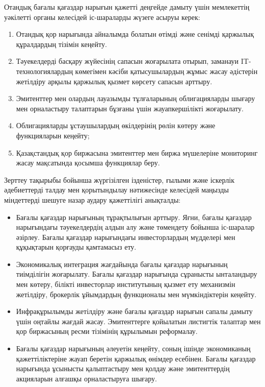 Отандық бағалы қағаздар нарығын қажетті деңгейде дамыту үшін мемлекеттің
уәкілетті органы келесідей іс-шараларды жүзеге асыруы керек:

\begin{enumerate}
\def\labelenumi{\arabic{enumi}.}
\item
  Отандық қор нарығында айналымда болатын өтімді және сенімді қаржылық
  құралдардың тізімін кеңейту.
\item
  Тәуекелдерді басқару жүйесінің сапасын жоғарылата отырып, заманауи
  IT-технологиялардың көмегімен кәсіби қатысушылардың жұмыс жасау
  әдістерін жетілдіру арқылы қаржылық қызмет көрсету сапасын арттыру.
\item
  Эмитенттер мен олардың лауазымды тұлғаларының облигацияларды шығару
  мен орналастыру талаптарын бұзғаны үшін жауапкершілікті жоғарылату.
\item
  Облигацияларды ұстаушылардың өкілдерінің рөлін көтеру және
  функцияларын кеңейту;
\item
  Қазақстандық қор биржасына эмитенттер мен биржа мүшелеріне мониторинг
  жасау мақсатында қосымша функциялар беру.
\end{enumerate}

Зерттеу тақырыбы бойынша жүргізілген ізденістер, ғылыми және іскерлік
әдебиеттерді талдау мен қорытындылау нәтижесінде келесідей маңызды
міндеттерді шешуге назар аудару қажеттілігі анықталды:

\begin{itemize}
\item
  Бағалы қағаздар нарығының тұрақтылығын арттыру. Яғни, бағалы қағаздар
  нарығындағы тәуекелдердің алдын алу және төмендету бойынша іс-шаралар
  әзірлеу. Бағалы қағаздар нарығындағы инвесторлардың мүдделері мен
  құқықтарын қорғауды қамтамасыз ету.
\item
  Экономикалық интеграция жағдайында бағалы қағаздар нарығының
  тиімділігін жоғарылату. Бағалы қағаздар нарығында сұранысты
  ынталандыру мен көтеру, білікті инвесторлар институтының қызмет ету
  механизмін жетілдіру, брокерлік ұйымдардың функционалы мен
  мүмкіндіктерін кеңейту.
\item
  Инфрақұрылымды жетілдіру және бағалы қағаздар нарығын сапалы дамыту
  үшін оңтайлы жағдай жасау. Эмитенттерге қойылатын листигтік талаптар
  мен қор биржасының ресми тізімінің құрылымын реформалау.
\item
  Бағалы қағаздар нарығының әлеуетін кеңейту, соның ішінде экономиканың
  қажеттіліктеріне жауап беретін қаржылық өнімдер есебінен. Бағалы
  қағаздар нарығында ұсынысты қалыптастыру мен қолдау және эмитенттердің
  акцияларын алғашқы орналастыруға шығару.
\end{itemize}

